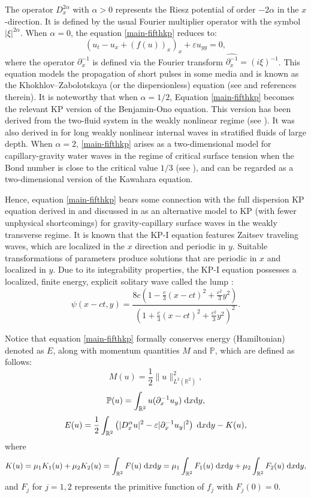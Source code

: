 \documentclass[10pt]{article}
\numberwithin{equation}{section}
\newcommand{\lt}{{L^2(\mathbb{R}^2)}}
\newcommand{\dz}{\;{\rm d}x{\rm d}y}
\newcommand{\e}{\varepsilon}
\newcommand{\nd}{{\partial_x^{-1}}}
\newcommand{\dx}{D_x^{\alpha}}
\newcommand{\al}{\alpha}
\newcommand{\rt}{{\mathbb{R}^2}}
\begin{document}
	The operator $D^{2\al}_x$ with $\al>0$ represents the Riesz potential of order $-2\al$ in the $x$-direction. It is defined by the usual Fourier multiplier operator with the symbol $|\xi|^{2\al}$. When $\al=0$, the equation \eqref{main-fifthkp} reduces to:
	\begin{equation}\label{dispersionless}
		(u_t-u_x+(f(u))_x)_x + \e u_{yy}=0,
	\end{equation}
	where the operator $\nd$ is defined via the Fourier transform $\widehat{\nd}=(i\xi)^{-1}$. This equation models the propagation of short pulses in some media and is known as the Khokhlov–Zabolotskaya (or the dispersionless) equation (see \cite{roud} and references therein).
	It is noteworthy that when $\alpha=1/2$, Equation \eqref{main-fifthkp} becomes the relevant KP version of the Benjamin-Ono equation. This version has been derived from the two-fluid system in the weakly nonlinear regime (see \cite{choicam}). It was also derived in \cite{abs,cgh} for long weakly nonlinear internal waves in stratified fluids of large depth. When $\alpha=2$, \eqref{main-fifthkp} arises as a two-dimensional model for capillary-gravity water waves in the regime of critical surface tension when the Bond number is close to the critical value $1/3$ (see \cite{abst,nonlinearity,karbel}), and can be regarded as a two-dimensional version of the Kawahara equation.
	
	Hence, equation \eqref{main-fifthkp} bears some connection with the full dispersion KP equation derived in \cite{lann-1} and discussed in \cite{lann-2} as an alternative model to KP (with fewer unphysical shortcomings) for gravity-capillary surface waves in the weakly transverse regime. It is known that the KP-I equation features Zaitsev traveling waves, which are localized in the $x$ direction and periodic in $y$. Suitable transformations of parameters produce solutions that are periodic in $x$ and localized in $y$. Due to its integrability properties, the KP-I equation possesses a localized, finite energy, explicit solitary wave called the lump \cite{mzbim}:
	\[
	\psi(x-ct,y)=
	\frac{8c\left(1-\frac c3(x-ct)^2+\frac{c^2}{3}y^2\right)}{\left(1+\frac c3(x-ct)^2+\frac{c^2}{3}y^2\right)^2}.
	\]
	
	Notice that equation \eqref{main-fifthkp} formally conserves energy (Hamiltonian) denoted as $E$, along with momentum quantities $M$ and $\mathbb{P}$, which are defined as follows:
	\begin{equation}\label{mass}
		M(u)=\frac12\|u\|_\lt^2,
	\end{equation}
	\[
	\mathbb{P}(u)=\int_\rt u(\nd u_y)\dz,
	\]
	\begin{equation}\label{energy}
		E(u)=\frac{1}{2}\int_\rt\left(|\dx u|^2-\e|\nd u_y|^2\right)\dz-K(u),
	\end{equation}
	where 
	\[
	K(u)=\mu_1K_1(u)+\mu_2K_2(u)= \int_\rt F (u)\dz=\mu_1\int_\rt F_1(u)\dz+\mu_2\int_\rt F_2(u)\dz,
	\]
	and $F_j$ for $j=1,2$ represents the primitive function of $f_j$ with $F_j(0)=0$.
	
\end{document}
